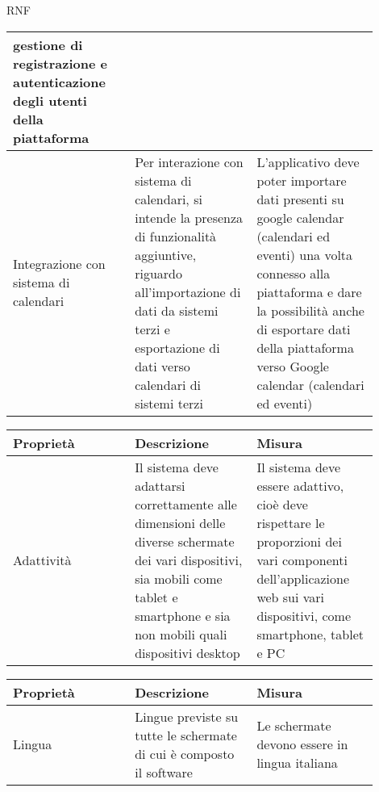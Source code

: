 \begin{listaPersonale}{RNF}
\begin{tabular}{|p{0.3\linewidth}|p{0.3\linewidth}|p{0.3\linewidth}|}
        gestione di registrazione e autenticazione
        degli utenti della piattaforma                            \\
        \hline
        Integrazione con sistema di calendari                   &
        Per interazione con sistema di calendari,
        si intende la presenza di funzionalità aggiuntive,
        riguardo all'importazione di dati da sistemi terzi
        e esportazione di dati verso calendari di sistemi terzi &
        L'applicativo deve poter importare dati
        presenti su google calendar (calendari ed eventi)
        una volta connesso alla piattaforma e dare la
        possibilità anche di esportare dati della piattaforma
        verso Google calendar (calendari ed eventi)               \\
        \hline
    \end{tabular}

    \begin{tabular}{|p{0.3\linewidth}|p{0.3\linewidth}|p{0.3\linewidth}|}
        \hline
        \rowcolor{viola} \textbf{Proprietà} &
        \textbf{Descrizione}                &
        \textbf{Misura}                       \\
        \hline
        Adattività                          &
        Il sistema deve adattarsi correttamente
        alle dimensioni delle diverse schermate
        dei vari dispositivi, sia mobili come
        tablet e smartphone e sia non mobili
        quali dispositivi desktop           &
        Il sistema deve essere adattivo,
        cioè deve rispettare le proporzioni
        dei vari componenti dell'applicazione
        web sui vari dispositivi,
        come smartphone, tablet e PC          \\
        \hline
    \end{tabular}

    \begin{tabular}{|p{0.3\linewidth}|p{0.3\linewidth}|p{0.3\linewidth}|}
        \hline
        \rowcolor{viola} \textbf{Proprietà} &
        \textbf{Descrizione}                &
        \textbf{Misura}                       \\
        \hline
        Lingua                              &
        Lingue previste su tutte le
        schermate di cui è composto
        il software                         &
        Le schermate devono
        essere in lingua italiana             \\
        \hline
    \end{tabular}


\end{listaPersonale}

